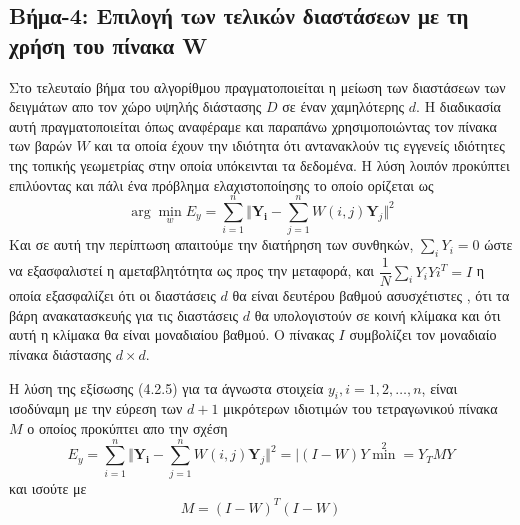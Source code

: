 \subsection{Βήμα-4: Επιλογή των τελικών διαστάσεων με τη χρήση του πίνακα \textlatin{W}}
\par
Στο τελευταίο βήμα του αλγορίθμου πραγματοποιείται η μείωση των διαστάσεων των δειγμάτων απο τον χώρο υψηλής διάστασης $D$ σε έναν χαμηλότερης $d$. Η διαδικασία αυτή πραγματοποιείται όπως αναφέραμε και παραπάνω χρησιμοποιώντας τον πίνακα των βαρών $W$ και τα οποία έχουν την ιδιότητα ότι αντανακλούν τις εγγενείς ιδιότητες της τοπικής γεωμετρίας στην οποία υπόκεινται τα δεδομένα. Η λύση λοιπόν προκύπτει επιλύοντας και πάλι ένα πρόβλημα ελαχιστοποίησης το οποίο ορίζεται ως
\newline\hspace*{\fill}
\begin{equation}
        \arg \min_{w} E_{y} = \sum_{i=1}^{n} \Vert \mathbf{Y_{i}} - \sum_{j=1}^{n} W(i,j)\mathbf{Y}_{j} \Vert ^{2}
\end{equation}
\hspace*{\fill}\newline
Και σε αυτή την περίπτωση  απαιτούμε την διατήρηση των συνθηκών, $\sum_{i} Y_{i} = 0$ ώστε να εξασφαλιστεί η αμεταβλητότητα ως προς την μεταφορά, και $ \dfrac{1}{N} \sum_{i} Y_{i}Y{i}^{T} = I $ η οποία εξασφαλίζει ότι οι διαστάσεις $d$ θα είναι δευτέρου βαθμού ασυσχέτιστες , ότι τα βάρη ανακατασκευής για τις διαστάσεις $d$ θα υπολογιστούν σε κοινή κλίμακα και ότι αυτή η κλίμακα θα είναι μοναδιαίου βαθμού. Ο πίνακας $I$ συμβολίζει τον μοναδιαίο πίνακα διάστασης $d \times d$. 
\par
Η λύση της εξίσωσης (4.2.5) για τα άγνωστα στοιχεία $y_{i},i=1,2,\ldots,n$, είναι ισοδύναμη με την εύρεση των $d+1$ μικρότερων ιδιοτιμών του τετραγωνικού πίνακα $M$ ο οποίος προκύπτει απο την σχέση
\newline\hspace*{\fill}
\begin{equation}
        E_{y} = \sum_{i=1}^{n} \Vert \mathbf{Y_{i}} - \sum_{j=1}^{n} W(i,j)\mathbf{Y}_{j} \Vert ^{2} = \mid (I-W)Y \min ^{2} = Y_{T}MY
\end{equation}
\hspace*{\fill}\newline
και ισούτε με
\begin{equation}
        M = (I-W)^{T}(I-W)
\end{equation}
\hspace*{\fill}\newline

